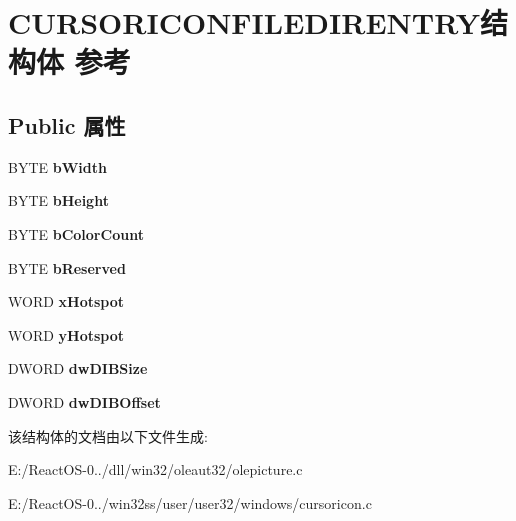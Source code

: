 \hypertarget{struct_c_u_r_s_o_r_i_c_o_n_f_i_l_e_d_i_r_e_n_t_r_y}{}\section{C\+U\+R\+S\+O\+R\+I\+C\+O\+N\+F\+I\+L\+E\+D\+I\+R\+E\+N\+T\+R\+Y结构体 参考}
\label{struct_c_u_r_s_o_r_i_c_o_n_f_i_l_e_d_i_r_e_n_t_r_y}
\subsection*{Public 属性}
\begin{DoxyCompactItemize}
\item 
\mbox{\label{struct_c_u_r_s_o_r_i_c_o_n_f_i_l_e_d_i_r_e_n_t_r_y_a58934971921d733d5648192dc8d17a2e}} 
B\+Y\+TE {\bfseries b\+Width}
\item 
\mbox{\label{struct_c_u_r_s_o_r_i_c_o_n_f_i_l_e_d_i_r_e_n_t_r_y_a0d803448c196633460127242938545f1}} 
B\+Y\+TE {\bfseries b\+Height}
\item 
\mbox{\label{struct_c_u_r_s_o_r_i_c_o_n_f_i_l_e_d_i_r_e_n_t_r_y_a4064b5cff00b626093da648119914878}} 
B\+Y\+TE {\bfseries b\+Color\+Count}
\item 
\mbox{\label{struct_c_u_r_s_o_r_i_c_o_n_f_i_l_e_d_i_r_e_n_t_r_y_a38e221d00ead7e912f4e1f6ad7c17bb3}} 
B\+Y\+TE {\bfseries b\+Reserved}
\item 
\mbox{\label{struct_c_u_r_s_o_r_i_c_o_n_f_i_l_e_d_i_r_e_n_t_r_y_a07ebdf88f5813bbf98428d2c503077e3}} 
W\+O\+RD {\bfseries x\+Hotspot}
\item 
\mbox{\label{struct_c_u_r_s_o_r_i_c_o_n_f_i_l_e_d_i_r_e_n_t_r_y_a0ff128147e4dd32f2a18d4a756cba818}} 
W\+O\+RD {\bfseries y\+Hotspot}
\item 
\mbox{\label{struct_c_u_r_s_o_r_i_c_o_n_f_i_l_e_d_i_r_e_n_t_r_y_a3616fc169209733f784c7704b61302a1}} 
D\+W\+O\+RD {\bfseries dw\+D\+I\+B\+Size}
\item 
\mbox{\label{struct_c_u_r_s_o_r_i_c_o_n_f_i_l_e_d_i_r_e_n_t_r_y_a388c4d142a8e681afcc39103d2224dca}} 
D\+W\+O\+RD {\bfseries dw\+D\+I\+B\+Offset}
\end{DoxyCompactItemize}


该结构体的文档由以下文件生成\+:\begin{DoxyCompactItemize}
\item 
E\+:/\+React\+O\+S-\/0../dll/win32/oleaut32/olepicture.\+c\item 
E\+:/\+React\+O\+S-\/0../win32ss/user/user32/windows/cursoricon.\+c\end{DoxyCompactItemize}
